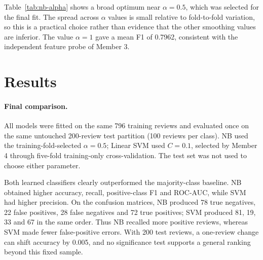 Table~\ref{tab:nb-alpha} shows a broad optimum near $\alpha=0.5$, which was
selected for the final fit. The spread across $\alpha$ values is small relative
to fold-to-fold variation, so this is a practical choice rather than evidence
that the other smoothing values are inferior. The value $\alpha=1$ gave a mean
F1 of 0.7962, consistent with the independent feature probe of Member 3.

\section{Results}
\label{sec:results}

\paragraph{Final comparison.}
All models were fitted on the same 796 training reviews and evaluated once on
the same untouched 200-review test partition (100 reviews per class). NB used
the training-fold-selected $\alpha=0.5$; Linear SVM used $C=0.1$, selected by
Member 4 through five-fold training-only cross-validation. The test set was not
used to choose either parameter.

\begin{table}[t]
  \caption{Final test-set comparison on 200 reviews. ``Dummy'' predicts the
  majority training class. F1 and precision refer to the positive (Liked=1)
  class. NB scores are predicted probabilities; SVM scores are decision
  function values; both are rank-valid for ROC-AUC.}
  \label{tab:final-comparison}
  \centering
\end{table}

Both learned classifiers clearly outperformed the majority-class baseline.
NB obtained higher accuracy, recall, positive-class F1 and ROC-AUC, while SVM
had higher precision. On the confusion matrices,
NB produced 78 true negatives, 22 false positives, 28 false negatives and 72
true positives; SVM produced 81, 19, 33 and 67 in the same order. Thus NB
recalled more positive reviews, whereas SVM made fewer false-positive errors.
With 200 test reviews, a one-review change can shift accuracy by 0.005, and no
significance test supports a general ranking beyond this fixed sample.

